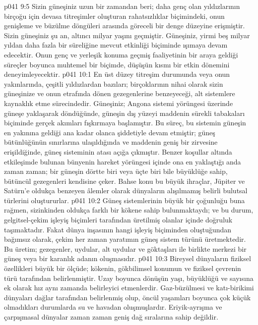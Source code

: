 \vs p041 9:5 Sizin güneşiniz uzun bir zamandan beri; daha genç olan yıldızlarının birçoğu için devasa titreşimler oluşturan rahatsızlıklar biçimindeki, onun genişleme ve büzülme döngüleri arasında göreceli bir denge düzeyine erişmiştir. Sizin güneşiniz şu an, altıncı milyar yaşını geçmiştir. Güneşiniz, yirmi beş milyar yıldan daha fazla bir süreliğine mevcut etkinliği biçiminde ışımaya devam edecektir. Onun genç ve yerleşik konuma geçmiş faaliyetinin bir araya geldiği süreçler boyunca muhtemel bir biçimde, düşüşün kısmı bir etkin dönemini deneyimleyecektir.
\vs p041 10:1 En üst düzey titreşim durumunda veya onun yakınlarında, çeşitli yıldızlardan bazıları; birçoklarının nihai olarak sizin güneşinize ve onun etrafında dönen gezegenlerine benzeyeceği, alt sistemlere kaynaklık etme sürecindedir. Güneşiniz; Angona sistemi yörüngesi üzerinde güneşe yaklaşarak döndüğünde, güneşin dış yüzeyi maddenin sürekli tabakaları biçiminde gerçek akımları fışkırmaya başlamıştır. Bu süreç, bu sistemin güneşin en yakınına geldiği ana kadar olanca şiddetiyle devam etmiştir; güneş bütünlüğünün sınırlarına ulaşıldığında ve maddenin geniş bir zirvesine erişildiğinde, güneş sisteminin atası açığa çıkmıştır. Benzer koşullar altında etkileşimde bulunan bünyenin hareket yörüngesi içinde ona en yaklaştığı anda zaman zaman; bir güneşin dörtte biri veya üçte biri bile büyüklüğe sahip, bütüncül gezegenleri kendisine çeker. Bahse konu bu büyük ihraçlar, Jüpiter ve Satürn’e oldukça benzeyen âlemler olarak dünyaların alışılmamış belirli bulutsal türlerini oluştururlar.
\vs p041 10:2 Güneş sistemlerinin büyük bir çoğunluğu buna rağmen, sizinkinden oldukça farklı bir kökene sahip bulunmaktaydı; ve bu durum, gelgitsel\hyp{}çekim işleyiş biçimleri tarafından üretilmiş olanlar içinde doğruluk taşımaktadır. Fakat dünya inşasının hangi işleyiş biçiminden oluştuğundan bağımsız olarak, çekim her zaman yaratımın güneş sistem türünü üretmektedir. Bu üretim; gezegenler, uydular, alt uydular ve göktaşları ile birlikte merkezi bir güneş veya bir karanlık adanın oluşmasıdır.
\vs p041 10:3 Bireysel dünyaların fiziksel özellikleri büyük bir ölçüde; kökenin, gökbilimsel konumun ve fiziksel çevrenin türü tarafından belirlenmiştir. Uzay boyunca dönüşün yaşı, büyüklüğü ve sayısına ek olarak hız aynı zamanda belirleyici etmenlerdir. Gaz\hyp{}büzülmesi ve katı\hyp{}birikimi dünyaları dağlar tarafından belirlenmiş olup, öncül yaşamları boyunca çok küçük olmadıkları durumlarda su ve havadan oluşmuşlardır. Eriyik\hyp{}ayrışma ve çarpışmasal dünyalar zaman zaman geniş dağ sıralarına sahip değildir.
